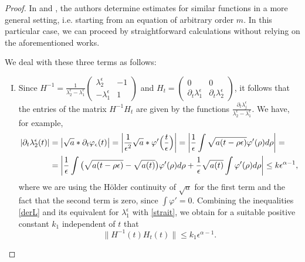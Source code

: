 \documentclass[12pt,oneside,a4paper]{book}
\numberwithin{equation}{section}     %
\theoremstyle{plain}
\theoremstyle{definition}
\begin{document}
\begin{proof}
	In \cite{GR2012} and \cite{CK2002}, the authors determine estimates for similar functions in a more general setting, i.e. starting from an equation of arbitrary order $m$. In this particular case, we can proceed by straightforward calculations without relying on the aforementioned works. 
	
	We deal with these three terms as follows:
	\begin{enumerate}[I)]
		\item Since $H^{-1}=\frac{1}{\lambda_2^\epsilon-\lambda_1^\epsilon}\begin{pmatrix}\lambda_2^\epsilon &-1\\-\lambda_1^\epsilon & 1
		\end{pmatrix}$ and $H_t=\begin{pmatrix}0 & 0\\\partial_t\lambda_1^\epsilon & \partial_t\lambda_2^\epsilon
		\end{pmatrix}$, it follows that the entries of the matrix $H^{-1}H_t$ are given by the functions $\frac{\partial_t \lambda_j^\epsilon}{\lambda_2^\epsilon-\lambda_1^\epsilon}$. We have, for example,
		\begin{align}\notag
		|\partial_t\lambda_2^\epsilon(t)|&=\left|\sqrt a * \partial_t \varphi_\epsilon(t)\right|=\left|\frac{1}{\epsilon^2}\sqrt a *\varphi'\Big(\frac{t}{\epsilon}\Big)\right|=\left|\frac{1}{\epsilon}\int\sqrt{a(t-\rho\epsilon)}\varphi'(\rho)d\rho\right|=\\\label{derL}
		&=\left|\frac{1}{\epsilon}\int\big(\sqrt{a(t-\rho\epsilon)}-\sqrt{a(t)}\big)\varphi'(\rho)d\rho+\frac{1}{\epsilon}\sqrt{a(t)}\int\varphi'(\rho)d\rho\right|\leq k\epsilon^{\alpha -1},
		\end{align}
		where we are using the H\"older continuity of $\sqrt a$ for the first term and the fact that the second term is zero, since $\int \varphi'=0 $.
		Combining the inequalities \eqref{derL} and its equivalent for $\lambda_1^\epsilon$ with \eqref{strait}, we obtain for a suitable positive constant $k_1$ independent of $t$ that
		\[
		\|H^{-1}(t)H_t(t)\|\leq k_1\epsilon^{\alpha-1}.
		\]
		

\end{enumerate}
\end{proof}
\end{document}
